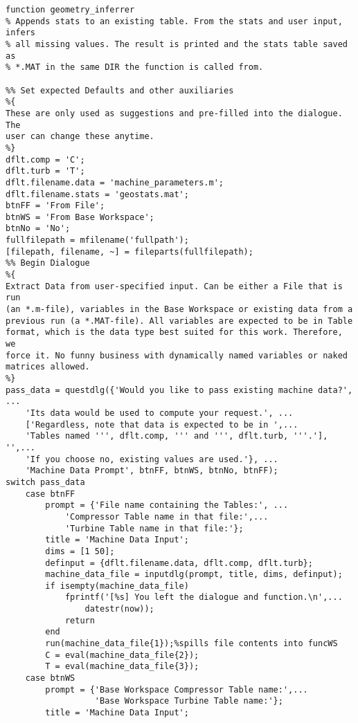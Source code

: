 \begin{lstlisting}[caption={[Geometry Inference Tool] Geometry inference tool, \iecfeg{cf.}\ \cref{ch:geometric_similitude}. To generate Tables as used in this work, refer to \cref{matlab:geometry_tables}},label={matlab:geometry_inferrer}]
function geometry_inferrer
% Appends stats to an existing table. From the stats and user input, infers
% all missing values. The result is printed and the stats table saved as
% *.MAT in the same DIR the function is called from.

%% Set expected Defaults and other auxiliaries
%{
These are only used as suggestions and pre-filled into the dialogue. The
user can change these anytime.
%}
dflt.comp = 'C';
dflt.turb = 'T';
dflt.filename.data = 'machine_parameters.m';
dflt.filename.stats = 'geostats.mat';
btnFF = 'From File';
btnWS = 'From Base Workspace';
btnNo = 'No';
fullfilepath = mfilename('fullpath');
[filepath, filename, ~] = fileparts(fullfilepath);
%% Begin Dialogue
%{
Extract Data from user-specified input. Can be either a File that is run
(an *.m-file), variables in the Base Workspace or existing data from a
previous run (a *.MAT-file). All variables are expected to be in Table
format, which is the data type best suited for this work. Therefore, we
force it. No funny business with dynamically named variables or naked
matrices allowed.
%}
pass_data = questdlg({'Would you like to pass existing machine data?', ...
    'Its data would be used to compute your request.', ...
    ['Regardless, note that data is expected to be in ',...
    'Tables named ''', dflt.comp, ''' and ''', dflt.turb, '''.'], '',...
    'If you choose no, existing values are used.'}, ...
    'Machine Data Prompt', btnFF, btnWS, btnNo, btnFF);
switch pass_data
    case btnFF
        prompt = {'File name containing the Tables:', ...
            'Compressor Table name in that file:',...
            'Turbine Table name in that file:'};
        title = 'Machine Data Input';
        dims = [1 50];
        definput = {dflt.filename.data, dflt.comp, dflt.turb};
        machine_data_file = inputdlg(prompt, title, dims, definput);
        if isempty(machine_data_file)
            fprintf('[%s] You left the dialogue and function.\n',...
                datestr(now));
            return
        end
        run(machine_data_file{1});%spills file contents into funcWS
        C = eval(machine_data_file{2});
        T = eval(machine_data_file{3});
    case btnWS
        prompt = {'Base Workspace Compressor Table name:',...
                  'Base Workspace Turbine Table name:'};
        title = 'Machine Data Input';

\end{lstlisting}
